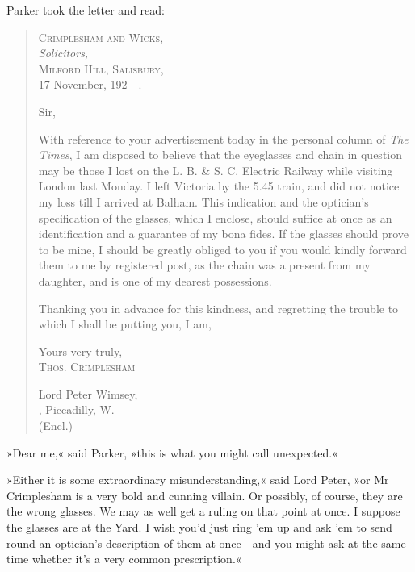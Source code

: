 Parker took the letter and read:
\begin{quotation}
\begin{flushright}
\hfill
\begin{minipage}{0.6\linewidth}
\textsc{Crimplesham and Wicks,}\\
\vin \textit{Solicitors,}\\
\textsc{Milford Hill, Salisbury,}\\
17 November, 192---.
\end{minipage}
\end{flushright}

\noindent Sir,

With reference to your advertisement today in the personal column of \textit{The Times}, I am disposed to believe that the eyeglasses and chain in question may be those I lost on the L. B. \& S. C. Electric Railway while visiting London last Monday. I left Victoria by the 5.45 train, and did not notice my loss till I arrived at Balham. This indication and the optician's specification of the glasses, which I enclose, should suffice at once as an identification and a guarantee of my bona fides. If the glasses should prove to be mine, I should be greatly obliged to you if you would kindly forward them to me by registered post, as the chain was a present from my daughter, and is one of my dearest possessions.

Thanking you in advance for this kindness, and regretting the trouble to which I shall be putting you, I am,

\begin{flushright}
Yours very truly,\\
\textsc{Thos. Crimplesham}\\
\end{flushright}

\noindent Lord Peter Wimsey,\\
, Piccadilly, W.\\
\noindent (Encl.)
\end{quotation}

»Dear me,« said Parker, »this is what you might call unexpected.«

»Either it is some extraordinary misunderstanding,« said Lord Peter, »or Mr Crimplesham is a very bold and cunning villain. Or possibly, of course, they are the wrong glasses. We may as well get a ruling on that point at once. I suppose the glasses are at the Yard. I wish you'd just ring 'em up and ask 'em to send round an optician's description of them at once\allowbreak---\allowbreak and you might ask at the same time whether it's a very common prescription.«


